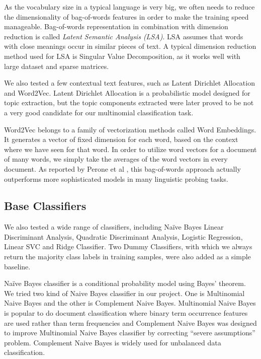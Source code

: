 \documentclass[compsoc]{IEEEtran}
\begin{document}
As the vocabulary size in a typical language is very big, we often needs to reduce the dimensionality of bag-of-words features in order to make the training speed manageable. Bag-of-words representation in combination with dimension reduction is called \textit{Latent Semantic Analysis (LSA)}. LSA assumes that words with close meanings occur in similar pieces of text. A typical dimension reduction method used for LSA is Singular Value Decomposition, as it works well with large dataset and sparse matrices.

We also tested a few contextual text features, such as Latent Dirichlet Allocation and Word2Vec. Latent Dirichlet Allocation is a probabilistic model designed for topic extraction, but the topic components extracted were later proved to be not a very good candidate for our multinomial classification task.

Word2Vec belongs to a family of vectorization methods called Word Embeddings. It generates a vector of fixed dimension for each word, based on the context where we have seen for that word. In order to utilize word vectors for a document of many words, we simply take the averages of the word vectors in every document. As reported by Perone et al \cite{perone}, this bag-of-words approach actually outperforms  more sophisticated models in many linguistic probing tasks.

\subsection{Base Classifiers}

We also tested a wide range of classifiers, including Na\"ive Bayes Linear Discriminant Analysis, Quadratic Discriminant Analysis, Logistic Regression, Linear SVC and Ridge Classifier. Two Dummy Classifiers, with which we always return the majority class labels in training samples, were also added as a simple baseline.

Na\"ive Bayes classifier is a conditional probability model using Bayes' theorem. We tried two kind of Naive Bayes classifier in our project. One is Multinomial Naive Bayes and the other is Complement Naive Bayes. Multinomial Naive Bayes is popular to do document classification where binary term occurrence features are used rather than term frequencies and Complement Naive Bayes was designed to improve Multinomial Naive Bayes classifier by correcting “severe assumptions” problem. Complement Naive Bayes is widely used for unbalanced data classification.
\end{document}
